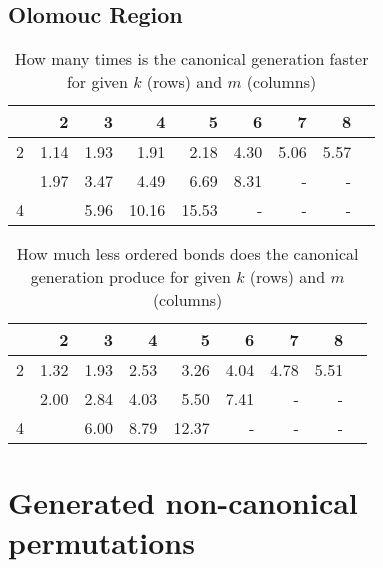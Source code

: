 \subsection*{Olomouc Region}


\begin{table}[H]
	\caption{How many times is the canonical generation faster for given $k$ (rows) and $m$ (columns)}
	\centering
	\begin{tabular}{c|rrrrrrrr}

\toprule

   &         2 &         3 &         4 &         5 &         6 &     7 &     8 \\ \midrule
2  &      1.14 &      1.93 &      1.91 &      2.18 &      4.30 &  5.06 &  5.57 \\
\evenrowcolor
3  &      1.97 &      3.47 &      4.49 &      6.69 &      8.31 &     - &     - \\
4  &           &      5.96 &     10.16 &     15.53 &         - &     - &     - \\

	\end{tabular}
\end{table}

\begin{table}[H]
	\caption{How much less ordered bonds does the canonical generation produce for given $k$ (rows) and $m$ (columns)}
	\centering
	\begin{tabular}{c|rrrrrrrr}

\toprule

   &      2 &         3 &         4 &         5 &         6 &         7 &         8 \\ \midrule
2  &   1.32 &      1.93 &      2.53 &      3.26 &      4.04 &      4.78 &      5.51 \\
\evenrowcolor
3  &   2.00 &      2.84 &      4.03 &      5.50 &      7.41 &         - &         - \\
4  &        &      6.00 &      8.79 &     12.37 &        -  &         - &         - \\



	\end{tabular}
\end{table}



\section*{Generated non-canonical permutations}


